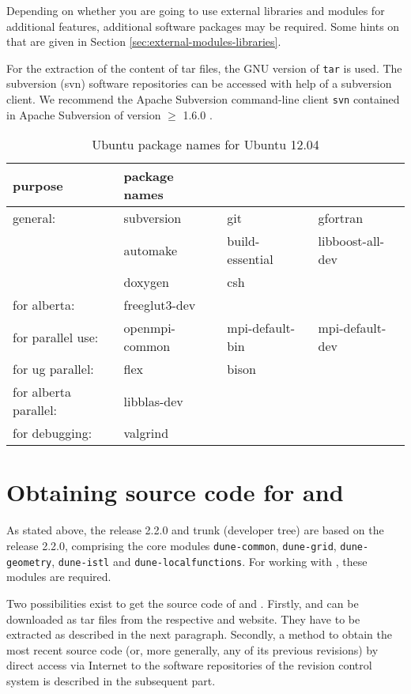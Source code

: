 Depending on whether you are going to use external libraries and modules for additional \Dune features, 
additional software packages may be required. Some hints on that are given in Section \ref{sec:external-modules-libraries}.

For the extraction of the content of tar files, the GNU version of \texttt{tar} is used.
The subversion (svn) software repositories can be accessed with help of a subversion client. We recommend the Apache Subversion command-line client \texttt{svn}
contained in Apache Subversion of version $\geqslant$ 1.6.0 \cite{APACHE-SUBVERSION-HP}.

\begin{table}
\centering
\caption{Ubuntu package names for Ubuntu 12.04}
\begin{tabular}{llll}
\toprule
\textbf{purpose} & \textbf{package names} \\
\midrule
general: & subversion & git & gfortran \\
& automake & build-essential & libboost-all-dev \\
& doxygen & csh\\
\midrule
for alberta: & freeglut3-dev &  \\
\midrule
for parallel use: & openmpi-common & mpi-default-bin & mpi-default-dev \\
\midrule
for ug parallel: & flex & bison & \\
\midrule
for alberta parallel: & libblas-dev &\\
\midrule
for debugging: & valgrind &\\
\bottomrule
\end{tabular}
\label{tbl:ubuntu-pkg}
\end{table}

\section{Obtaining source code for \Dune and \Dumux}
As stated above, the \Dumux release 2.2.0 and trunk (developer tree) are based on the \Dune release 2.2.0, 
comprising the core modules \texttt{dune-common}, \texttt{dune-grid}, \texttt{dune-geometry}, \texttt{dune-istl} and \texttt{dune-localfunctions}.
For working with \Dumux, these modules are required.

Two possibilities exist to get the source code of \Dune and \Dumux.
Firstly, \Dune and \Dumux can be downloaded as tar files from the respective \Dune and \Dumux website. They have to be extracted as described in the next paragraph.
Secondly, a method to obtain the most recent source code (or, more generally, any of its previous revisions) by direct access 
via Internet to the software repositories of the revision control system is described in the subsequent part. 

